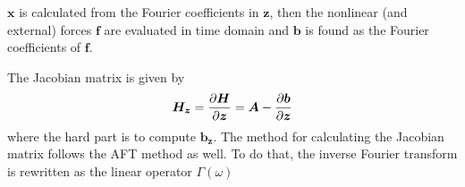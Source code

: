 \begin{center}
\end{center}

$\bm x$ is calculated from the Fourier coefficients in $\bm z$, then the
nonlinear (and external) forces $\bm f$ are evaluated in time domain and $\bm b$
is found as the Fourier coefficients of $\bm f$.

The Jacobian matrix is given by
\begin{equation}
  \label{eq:hb_jac1}
    \bm H_{\bm z} = \frac{\partial \bm H}{\partial \bm z} = \bm A - \frac{\partial \bm b}{\partial \bm z}
\end{equation}
where the hard part is to compute $\bm b_{\bm z}$. The method for calculating
the Jacobian matrix follows the AFT method as well. To do that, the inverse
Fourier transform is rewritten as the linear operator $\Gamma(\omega)$


